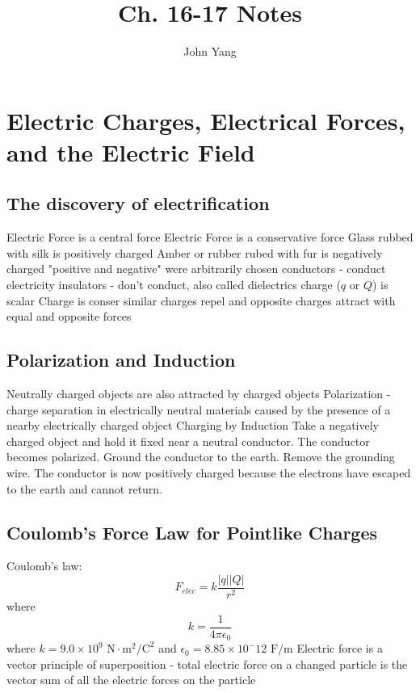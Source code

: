 \documentclass[twocolumn]{article}
\title{Ch. 16-17 Notes}
\author{John Yang}
\begin{document}
\maketitle
\section{Electric Charges, Electrical Forces, and the Electric Field}
\subsection{The discovery of electrification}
\begin{outline}
	\1 Electric Force is a central force
	\1 Electric Force is a conservative force
	\1 Glass rubbed with silk is positively charged
	\1 Amber or rubber rubed with fur is negatively charged
	\1 "positive and negative" were arbitrarily chosen
	\1 conductors - conduct electricity
	\1 insulators - don't conduct, also called dielectrics
	\1 charge ($q$ or $Q$) is scalar
	\1 Charge is conser
	\1 similar charges repel and opposite charges attract with equal and opposite forces
\end{outline}
\subsection{Polarization and Induction}
\begin{outline}
	\1 Neutrally charged objects are also attracted by charged objects
	\1 Polarization - charge separation in electrically neutral materials caused by the presence of a nearby electrically charged object
	\1 Charging by Induction
		\2 Take a negatively charged object and hold it fixed near a neutral conductor. The conductor becomes polarized. 
		\2 Ground the conductor to the earth. 
		\2 Remove the grounding wire. The conductor is now positively charged because the electrons have escaped to the earth and cannot return.

\end{outline}
\subsection{Coulomb's Force Law for Pointlike Charges}
\begin{outline}
	\1 Coulomb's law: \[F_{elec}=k\dfrac{|q||Q|}{r^2}\] where \[k=\dfrac{1}{4\pi\epsilon_0}\] where \(k=9.0\times10^9 \text{ N}\cdot\text{m}^2\text{/C}^2\) and \(\epsilon_0=8.85\times10^-12\text{ F/m}\)
	\1 Electric force is a vector
	\1 principle of superposition - total electric force on a changed particle is the vector sum of all the electric forces on the particle
\end{outline}
\end{document}
